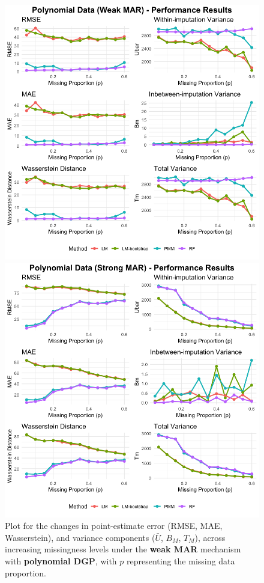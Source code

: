 \documentclass[12pt,oneside]{amsart}
\theoremstyle{definition}
\theoremstyle{remark}
\numberwithin{equation}{section}
\begin{document}
\begin{figure}[ht]
    \centering
    \begin{minipage}[b]{0.48\linewidth}
        \centering
        \includegraphics[width=\linewidth]{Report/Figure/result_poly_wmar.jpg}
        \caption{Plot for the changes in point-estimate error (RMSE, MAE, Wasserstein), and variance components ($\bar{U}$, $B_M$, $T_M$), across increasing missingness levels under the \textbf{weak MAR} mechanism with \textbf{polynomial DGP}, with $p$ representing the missing data proportion.}
        \label{fig:result_poly_wmar}
    \end{minipage}
    \hfill
    \begin{minipage}[b]{0.48\linewidth}
        \centering
        \includegraphics[width=\linewidth]{Report/Figure/result_poly_mar.jpg}

\end{minipage}
\end{figure}
\end{document}
